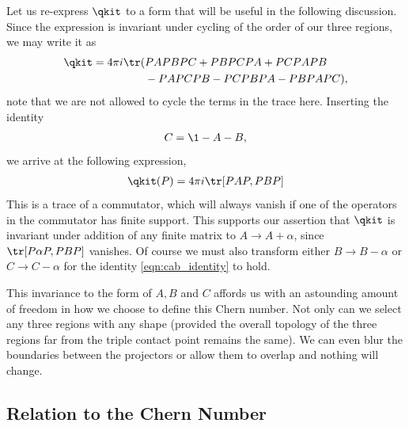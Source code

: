 Let us re-express $\qkit$ to a form that will be useful in the following discussion. Since the expression is invariant under cycling of the order of our three regions, we may write it as
\begin{align}
    \qkit = 4 \pi i \tr(
        &PAPBPC + PBPCPA + PCPAPB \\
        &- PAPCPB - PCPBPA - PBPAPC),
\end{align}
note that we are not allowed to cycle the terms in the trace here. Inserting the identity 
\begin{align}\label{eqn:cab_identity}
    C = \1 - A - B,
\end{align} 
we arrive at the following expression,
\begin{align}
    \qkit(P) = 4 \pi i \tr[
        PAP, PBP
    ]
\end{align}
This is a trace of a commutator, which will always vanish if one of the operators in the commutator has finite support. This supports our assertion that $\qkit$ is invariant under addition of any finite matrix to $A \rightarrow A + \alpha$, since $\tr[P\alpha P, PBP]$ vanishes. Of course we must also transform either $B \rightarrow B-\alpha$ or $C \rightarrow C-\alpha$ for the identity \ref{eqn:cab_identity} to hold.

This invariance to the form of $A, B$ and $C$ affords us with an astounding amount of freedom in how we choose to define this Chern number. Not only can we select any three regions with any shape (provided the overall topology of the three regions far from the triple contact point remains the same). We can even blur the boundaries between the projectors or allow them to overlap and nothing will change.

\subsection{Relation to the Chern Number}

